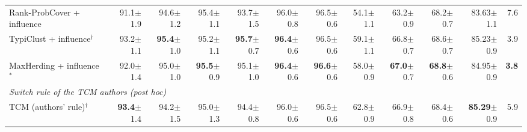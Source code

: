 \begin{table}[t]
\begin{adjustbox}{max width=\textwidth}
\begin{tabular}{lrrrrrrrrrrr}
\quad Rank-ProbCover + influence & 91.1{\scriptsize$\pm$1.9} & 94.6{\scriptsize$\pm$1.2} & 95.4{\scriptsize$\pm$1.1} & 93.7{\scriptsize$\pm$1.5} & 96.0{\scriptsize$\pm$0.8} & 96.5{\scriptsize$\pm$0.6} & 54.1{\scriptsize$\pm$1.1} & 63.2{\scriptsize$\pm$0.9} & 68.2{\scriptsize$\pm$0.7} & 83.63{\scriptsize$\pm$1.1} & 7.6 \\
\quad TypiClust + influence$^{\dagger}$ & 93.2{\scriptsize$\pm$1.1} & \textbf{95.4}{\scriptsize$\pm$1.0} & 95.2{\scriptsize$\pm$1.1} & \textbf{95.7}{\scriptsize$\pm$0.7} & \textbf{96.4}{\scriptsize$\pm$0.6} & 96.5{\scriptsize$\pm$0.6} & 59.1{\scriptsize$\pm$1.1} & 66.8{\scriptsize$\pm$0.7} & 68.6{\scriptsize$\pm$0.7} & 85.23{\scriptsize$\pm$0.9} & 3.9 \\
\quad MaxHerding + influence$^{*}$ & 92.0{\scriptsize$\pm$1.4} & 95.0{\scriptsize$\pm$1.0} & \textbf{95.5}{\scriptsize$\pm$0.9} & 95.1{\scriptsize$\pm$1.0} & \textbf{96.4}{\scriptsize$\pm$0.6} & \textbf{96.6}{\scriptsize$\pm$0.6} & 58.0{\scriptsize$\pm$0.9} & \textbf{67.0}{\scriptsize$\pm$0.7} & \textbf{68.8}{\scriptsize$\pm$0.6} & 84.95{\scriptsize$\pm$0.9} & \textbf{3.8} \\
\multicolumn{12}{l}{\textit{Switch rule of the TCM authors (post hoc)}} \\
\quad TCM (authors' rule)$^{\dagger}$~\cite{doucet2024bridging} & \textbf{93.4}{\scriptsize$\pm$1.4} & 94.2{\scriptsize$\pm$1.5} & 95.0{\scriptsize$\pm$1.3} & 94.4{\scriptsize$\pm$0.8} & 96.0{\scriptsize$\pm$0.6} & 96.5{\scriptsize$\pm$0.6} & 62.8{\scriptsize$\pm$0.9} & 66.9{\scriptsize$\pm$0.8} & 68.4{\scriptsize$\pm$0.6} & \textbf{85.29}{\scriptsize$\pm$0.9} & 5.9 \\
\bottomrule
\end{tabular}
\end{adjustbox}
\end{table}

